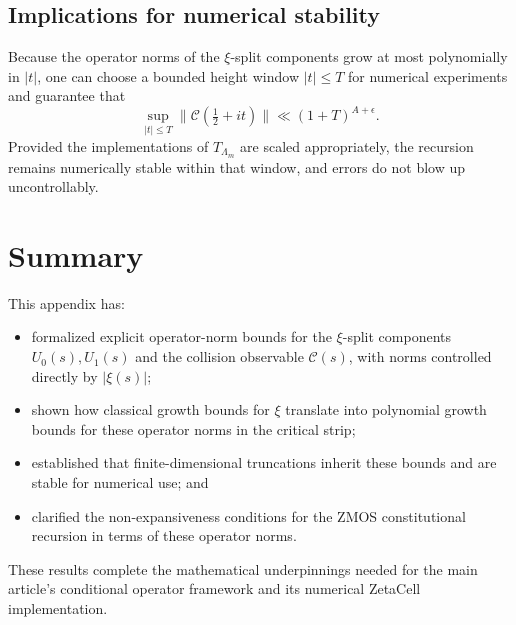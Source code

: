 \documentclass[11pt]{article}
\begin{document}
\subsection{Implications for numerical stability}

Because the operator norms of the $\xi$-split components grow at most polynomially in $|t|$, one can choose a bounded height window $|t|\le T$ for numerical experiments and guarantee that
\[
  \sup_{|t|\le T}\|\mathcal{C}(\tfrac12+it)\| \ll (1+T)^{A+\epsilon}.
\]
Provided the implementations of $T_{\Lambda_m}$ are scaled appropriately, the recursion remains numerically stable within that window, and errors do not blow up uncontrollably.

\section{Summary}

This appendix has:
\begin{itemize}
  \item formalized explicit operator-norm bounds for the $\xi$-split components $U_0(s),U_1(s)$ and the collision observable $\mathcal{C}(s)$, with norms controlled directly by $|\xi(s)|$;
  \item shown how classical growth bounds for $\xi$ translate into polynomial growth bounds for these operator norms in the critical strip;
  \item established that finite-dimensional truncations inherit these bounds and are stable for numerical use; and
  \item clarified the non-expansiveness conditions for the ZMOS constitutional recursion in terms of these operator norms.
\end{itemize}
These results complete the mathematical underpinnings needed for the main article's conditional operator framework and its numerical ZetaCell implementation.

\nocite{*}
  
  
\end{document}
